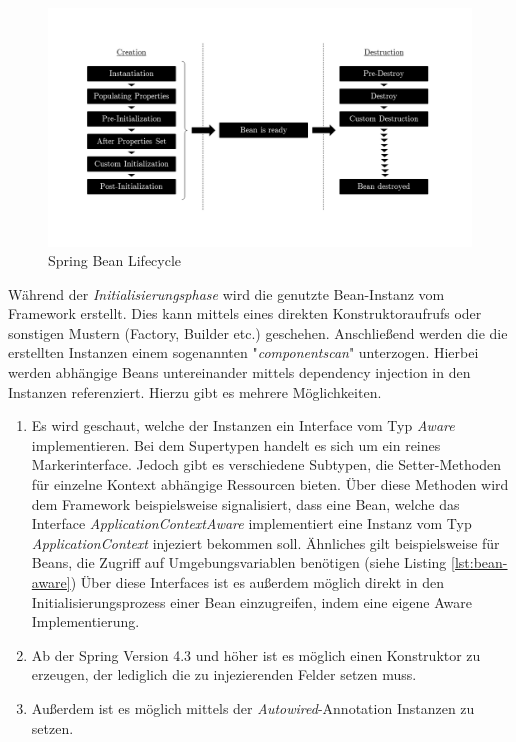 \begin{figure}[ht!]
	\centering
	\includegraphics[width=\linewidth]{kapitel/ergebnisanalyse/_img/bean-lifecycle}
	\caption[Bean Lifecycle]{Spring Bean Lifecycle \cite{bean-lifecycle}}
	\label{fig:bean-init}
\end{figure}

Während der \emph{Initialisierungsphase} wird die genutzte Bean-Instanz vom Framework erstellt. Dies kann mittels eines direkten Konstruktoraufrufs oder sonstigen Mustern (Factory, Builder etc.) geschehen. Anschließend werden die die erstellten Instanzen einem sogenannten "\emph{componentscan}" unterzogen. Hierbei werden abhängige Beans untereinander mittels dependency injection in den Instanzen referenziert. Hierzu gibt es mehrere Möglichkeiten. 

\begin{enumerate}
	\item Es wird geschaut, welche der Instanzen ein Interface vom Typ \emph{Aware} implementieren. Bei dem Supertypen handelt es sich um ein reines Markerinterface. Jedoch gibt es verschiedene Subtypen, die Setter-Methoden für einzelne Kontext abhängige Ressourcen bieten. Über diese Methoden wird dem Framework beispielsweise signalisiert, dass eine Bean, welche das Interface \emph{ApplicationContextAware} implementiert eine Instanz vom Typ \emph{ApplicationContext} injeziert bekommen soll. Ähnliches gilt beispielsweise für Beans, die Zugriff auf Umgebungsvariablen benötigen (siehe Listing \ref{lst:bean-aware}) Über diese Interfaces ist es außerdem möglich direkt in den Initialisierungsprozess einer Bean einzugreifen, indem eine eigene Aware Implementierung.
	\item Ab der Spring Version 4.3 und höher ist es möglich einen Konstruktor zu erzeugen, der lediglich die zu injezierenden Felder setzen muss.
	\item Außerdem ist es möglich mittels der \emph{Autowired}-Annotation Instanzen zu setzen.
\end{enumerate}

